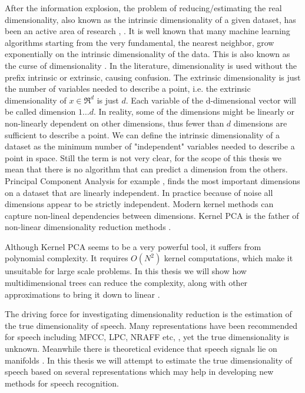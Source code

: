 \documentclass[12pt,letterpaper,doublespaced,ETD,dvips,proposal]{gtthesis}
\begin{document}
\begin{Body}
After the information explosion, the problem of reducing/estimating
the real dimensionality, also known as the intrinsic dimensionality of a
given dataset, has been an active area of research \cite{kegl2003ide}, \cite{costa2003egm}.
It is well known that many
machine learning algorithms starting from the very fundamental, the
nearest neighbor, grow exponentially on the intrinsic dimensionality of the data. This
is also known as the curse of dimensionality \cite{donoho2000hdd}.
In the literature, dimensionality is used without the prefix intrinsic or
extrinsic, causing confusion. The extrinsic dimensionality is just
the number of variables needed to describe a point, i.e. the
extrinsic dimensionality of $x\in \Re^d$ is just $d$. Each variable
of the d-dimensional vector will be called dimension $1\dots d$. In
reality, some of the dimensions might be linearly or non-linearly
dependent on other dimensions, thus fewer than $d$ dimensions are
sufficient to describe a point. We can define the intrinsic
dimensionality of a dataset as the minimum number of "independent"
variables needed to describe a point in space. Still the term is not
very clear, for the scope of this thesis we mean that there is no
algorithm that can predict a dimension from the others. Principal
Component Analysis for example \cite{jolliffe2002pca}, finds the most important dimensions
on a dataset that are linearly independent. In practice because of
noise all dimensions appear to be strictly independent.  Modern
kernel methods can capture non-lineal dependencies between
dimensions. Kernel PCA is the father of non-linear dimensionality
reduction methods \cite{scholkopf2002lks}.

Although Kernel PCA  seems to be a very powerful tool, it suffers from
polynomial complexity. It requires $O(N^2)$ kernel computations,
which make it unsuitable for large scale problems. In this thesis we
will show how  multidimensional trees can reduce
the complexity, along with other approximations to bring it down to
linear \cite{gray2000nbp}.

The driving force for investigating dimensionality reduction is the
estimation of the true dimensionality of speech. Many representations
have been recommended for speech including MFCC, LPC, NRAFF etc, \cite{quatieri2002dts,rabiner1978dps, ravindran:inr}, yet the true
dimensionality is unknown. Meanwhile there is theoretical evidence
that speech signals lie on manifolds
\cite{alder1991dss, sciamarella1999tsc, kumar1990ade, tishby1990dsa, jansen2006ifa}. In
this thesis we will attempt to estimate the true dimensionality of
speech based on several representations which may  help in developing new methods for speech
recognition.


\end{Body}
\end{document}
